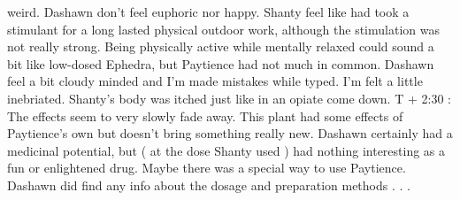 \documentclass[12pt]{book}
\begin{document}
weird. Dashawn don't feel euphoric nor happy. Shanty feel like had took a stimulant for a long lasted physical outdoor work, although the stimulation was not really strong. Being physically active while mentally relaxed could sound a bit like low-dosed Ephedra, but Paytience had not much in common. Dashawn feel a bit cloudy minded and I'm made mistakes while typed. I'm felt a little inebriated. Shanty's body was itched just like in an opiate come down. T + 2:30 : The effects seem to very slowly fade away. This plant had some effects of Paytience's own but doesn't bring something really new. Dashawn certainly had a medicinal potential, but ( at the dose Shanty used ) had nothing interesting as a fun or enlightened drug. Maybe there was a special way to use Paytience. Dashawn did find any info about the dosage and preparation methods . . . 
\end{document}
